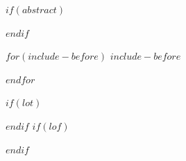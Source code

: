 \documentclass[$if(fontsize)$$fontsize$,$endif$$if(lang)$$babel-lang$,$endif$$if(papersize)$$papersize$paper,$endif$$for(classoption)$$classoption$$sep$,$endfor$]{article}
\begin{document}
\begin{titlepage}

\end{titlepage}

\newpage


$if(abstract)$
 \begin{abstract}
     $abstract$
 \end{abstract}
 \newpage
$endif$



$for(include-before)$
$include-before$

$endfor$

$if(lot)$
\newpage
\listoftables
$endif$
$if(lof)$
\newpage
\listoffigures
$endif$
\end{document}
